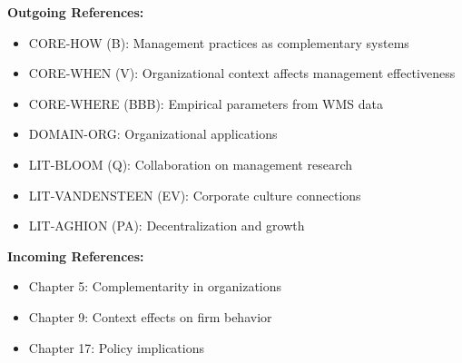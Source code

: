 \begin{tcolorbox}[colback=gray!5!white, colframe=gray!75!black, title=Cross-Reference Map]
\textbf{Outgoing References:}
\begin{itemize}[nosep]
    \item CORE-HOW (B): Management practices as complementary systems
    \item CORE-WHEN (V): Organizational context affects management effectiveness
    \item CORE-WHERE (BBB): Empirical parameters from WMS data
    \item DOMAIN-ORG: Organizational applications
    \item LIT-BLOOM (Q): Collaboration on management research
    \item LIT-VANDENSTEEN (EV): Corporate culture connections
    \item LIT-AGHION (PA): Decentralization and growth
\end{itemize}

\textbf{Incoming References:}
\begin{itemize}[nosep]
    \item Chapter 5: Complementarity in organizations
    \item Chapter 9: Context effects on firm behavior
    \item Chapter 17: Policy implications
\end{itemize}
\end{tcolorbox}


